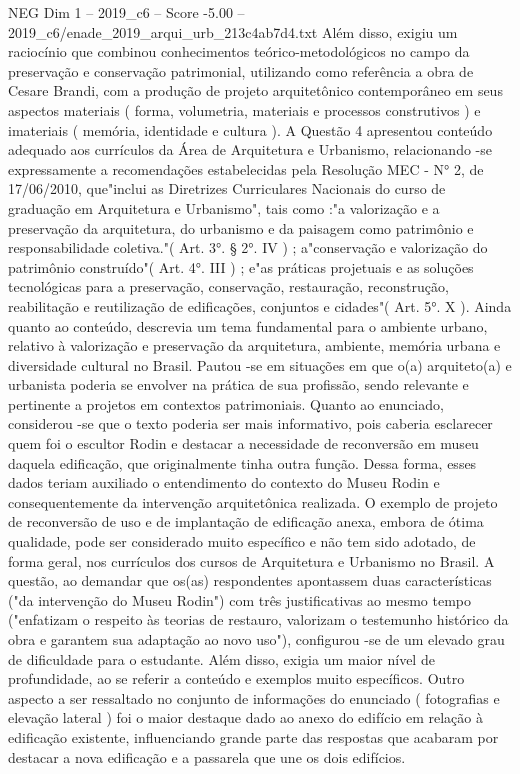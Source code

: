 \begin{textsample}{NEG Dim 1 – 2019\_c6 – Score -5.00 – 2019\_c6/enade\_2019\_arqui\_urb\_213c4ab7d4.txt}
Além disso, exigiu um raciocínio que combinou conhecimentos teórico-metodológicos no campo da preservação e conservação patrimonial, utilizando como referência a obra de Cesare Brandi, com a produção de projeto arquitetônico contemporâneo em seus aspectos materiais ( forma, volumetria, materiais e processos construtivos ) e imateriais ( memória, identidade e cultura ).
A Questão 4 apresentou conteúdo adequado aos currículos da Área de Arquitetura e Urbanismo, relacionando -se expressamente a recomendações estabelecidas pela Resolução MEC - N{\EmojiFont °} 2, de 17/06/2010, que"inclui as Diretrizes Curriculares Nacionais do curso de graduação em Arquitetura e Urbanismo", tais como :"a valorização e a preservação da arquitetura, do urbanismo e da paisagem como patrimônio e responsabilidade coletiva."( Art. 3{\EmojiFont °}. § 2{\EmojiFont °}.
IV ) ; a"conservação e valorização do patrimônio construído"( Art. 4{\EmojiFont °}.
III ) ; e"as práticas projetuais e as soluções tecnológicas para a preservação, conservação, restauração, reconstrução, reabilitação e reutilização de edificações, conjuntos e cidades"( Art. 5{\EmojiFont °}.
X ).
Ainda quanto ao conteúdo, descrevia um tema fundamental para o ambiente urbano, relativo à valorização e preservação da arquitetura, ambiente, memória urbana e diversidade cultural no Brasil.
Pautou -se em situações em que o(a) arquiteto(a) e urbanista poderia se envolver na prática de sua profissão, sendo relevante e pertinente a projetos em contextos patrimoniais.
Quanto ao enunciado, considerou -se que o texto poderia ser mais informativo, pois caberia esclarecer quem foi o escultor Rodin e destacar a necessidade de reconversão em museu daquela edificação, que originalmente tinha outra função.
Dessa forma, esses dados teriam auxiliado o entendimento do contexto do Museu Rodin e consequentemente da intervenção arquitetônica realizada.
O exemplo de projeto de reconversão de uso e de implantação de edificação anexa, embora de ótima qualidade, pode ser considerado muito específico e não tem sido adotado, de forma geral, nos currículos dos cursos de Arquitetura e Urbanismo no Brasil.
A questão, ao demandar que os(as) respondentes apontassem duas características ("da intervenção do Museu Rodin") com três justificativas ao mesmo tempo ("enfatizam o respeito às teorias de restauro, valorizam o testemunho histórico da obra e garantem sua adaptação ao novo uso"), configurou -se de um elevado grau de dificuldade para o estudante.
Além disso, exigia um maior nível de profundidade, ao se referir a conteúdo e exemplos muito específicos.
Outro aspecto a ser ressaltado no conjunto de informações do enunciado ( fotografias e elevação lateral ) foi o maior destaque dado ao anexo do edifício em relação à edificação existente, influenciando grande parte das respostas que acabaram por destacar a nova edificação e a passarela que une os dois edifícios.

\end{textsample}
